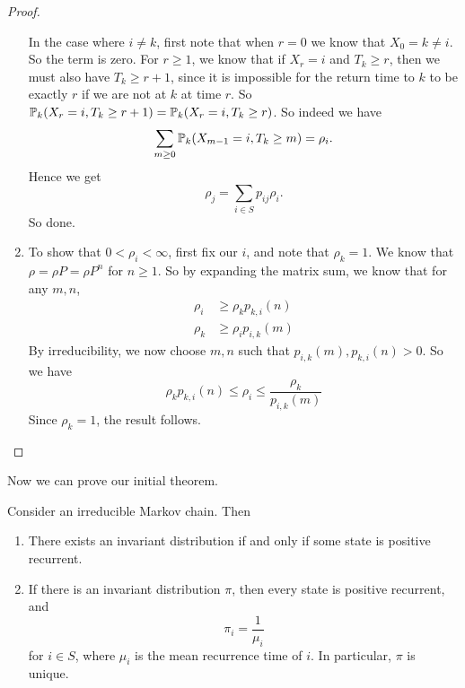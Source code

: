 \documentclass[a4paper]{article}
\begin{document}
\begin{proof}
\begin{enumerate}
      In the case where $i \not= k$, first note that when $r = 0$ we know that $X_0 = k \not= i$. So the term is zero. For $r \geq 1$, we know that if $X_r = i$ and $T_k \geq r$, then we must also have $T_k \geq r + 1$, since it is impossible for the return time to $k$ to be exactly $r$ if we are not at $k$ at time $r$. So $\P_k(X_r = i , T_k \geq r + 1) = \P_k(X_r = i, T_k \geq r)$. So indeed we have
      \[
        \sum_{m \geq 0} \P_k (X_{m - 1} = i, T_k \geq m) = \rho_i.
      \]
      Hence we get
      \[
        \rho_j = \sum_{i \in S} p_{ij} \rho_i.
      \]
      So done.

    \item To show that $0 < \rho_i < \infty$, first fix our $i$, and note that $\rho_k = 1$. We know that $\rho = \rho P = \rho P^n$ for $n \geq 1$. So by expanding the matrix sum, we know that for any $m, n$,
      \begin{align*}
        \rho_i &\geq \rho_k p_{k, i}(n)\\
        \rho_k &\geq \rho_i p_{i, k}(m)
      \end{align*}
      By irreducibility, we now choose $m, n$ such that $p_{i, k}(m), p_{k, i}(n) > 0$. So we have
      \[
        \rho_k p_{k, i}(n) \leq \rho_i \leq \frac{\rho_k}{p_{i, k}(m)}
      \]
      Since $\rho_k = 1$, the result follows.\qedhere
  \end{enumerate}
\end{proof}

Now we can prove our initial theorem.
\begin{thm}
  Consider an irreducible Markov chain. Then
  \begin{enumerate}
    \item There exists an invariant distribution if and only if some state is positive recurrent.
    \item If there is an invariant distribution $\pi$, then every state is positive recurrent, and
      \[
        \pi_i = \frac{1}{\mu_i}
      \]
      for $i \in S$, where $\mu_i$ is the mean recurrence time of $i$. In particular, $\pi$ is unique.
  \end{enumerate}
\end{thm}
\end{document}
